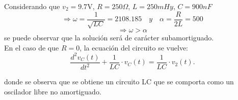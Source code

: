 \documentclass[a4paper]{article}
\begin{document}
Considerando que $v_2 = 9.7\textrm{V}$, $R = 250\Omega$, $L = 250mHy$, $C = 900nF$ \[\Rightarrow \omega=\frac{1}{\sqrt{LC}}= 2108.185\quad y \quad \alpha=\frac{R}{2L}= 500\] \[\Rightarrow \omega > \alpha\] se puede observar que la solución será de carácter subamortiguado.\\

En el caso de que $R=0$, la ecuación del circuito se vuelve:
\begin{equation}
\frac{d^{2}v_{C}(t)}{dt^{2}}+\frac{1}{LC}\cdot v_{C}(t)=\frac{1}{LC}\cdot v_{2}(t).
\end{equation}



donde se observa que se obtiene un circuito LC que se comporta como un oscilador libre no amortiguado.\\
\end{document}
